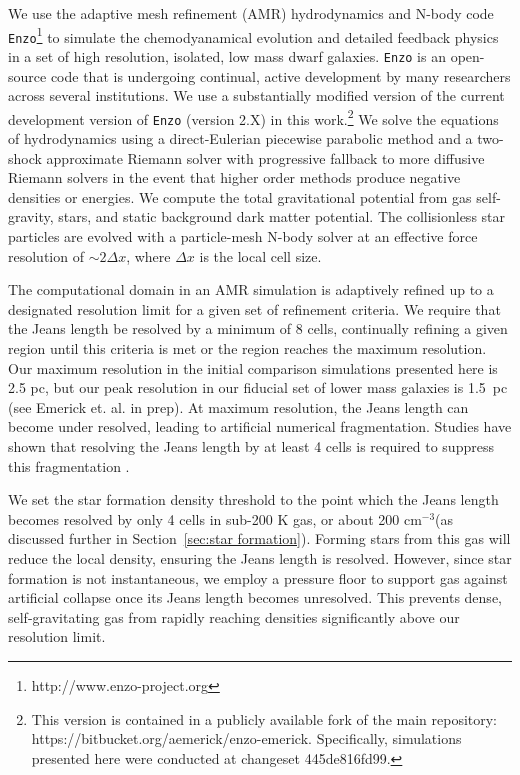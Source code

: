 \documentclass[twocolumn]{aastex61}
\newcommand{\ccunit}{cm$^{-3}$}
\begin{document}
We use the adaptive mesh refinement (AMR) hydrodynamics and N-body code \texttt{Enzo}\footnote{http://www.enzo-project.org} to simulate the chemodyanamical evolution and detailed feedback physics in a set of high resolution, isolated, low mass dwarf galaxies. \texttt{Enzo} is an open-source code that is undergoing continual, active development by many researchers across several institutions. We use a substantially modified version of the current development version of \texttt{Enzo} (version 2.X) in this work.\footnote{This version is contained in a publicly available fork of the main repository: https://bitbucket.org/aemerick/enzo-emerick. Specifically, simulations presented here were conducted at changeset 445de816fd99.} We solve the equations of hydrodynamics using a direct-Eulerian piecewise parabolic method \citep{ColellaWoodward1984, Bryan1995} and a two-shock approximate Riemann solver with progressive fallback to more diffusive Riemann solvers in the event that higher order methods produce negative densities or energies. We compute the total gravitational potential from gas self-gravity, stars, and static background dark matter potential. The collisionless star particles are evolved with a particle-mesh N-body solver at an effective force resolution of $\sim 2 \Delta x$, where $\Delta x$ is the local cell size. 

The computational domain in an AMR simulation is adaptively refined up to a designated resolution limit for a given set of refinement criteria. We require that the Jeans length be resolved by a minimum of 8 cells, continually refining a given region until this criteria is met or the region reaches the maximum resolution. Our maximum resolution in the initial comparison simulations presented here is 2.5 pc, but our peak resolution in our fiducial set of lower mass galaxies is 1.5~pc (see Emerick et. al. in prep). At maximum resolution, the Jeans length can become under resolved, leading to artificial numerical fragmentation. Studies have shown that resolving the Jeans length by at least 4 cells is required to suppress this fragmentation \citep{Truelove1997}.

We set the star formation density threshold to the point which the Jeans length becomes resolved by only 4 cells in sub-200 K gas, or about 200 \ccunit (as discussed further in Section~\ref{sec:star formation}). Forming stars from this gas will reduce the local density, ensuring the Jeans length is resolved. However, since star formation is not instantaneous, we employ a pressure floor to support gas against artificial collapse once its Jeans length becomes unresolved. This prevents dense, self-gravitating gas from rapidly reaching densities significantly above our resolution limit.
\end{document}
